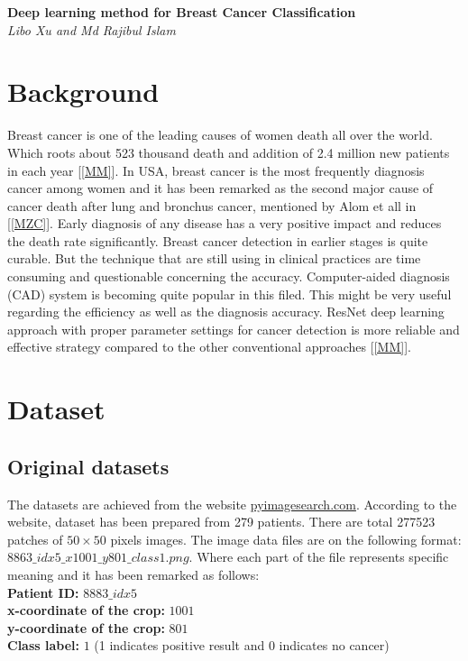 \documentclass[10 pt]{report}
\begin{document}
\begin{center}

\textbf{Deep learning method for Breast Cancer Classification}\\
 \textit{Libo Xu and Md Rajibul Islam} 
\end{center}

\section*{Background} Breast cancer is one of the leading causes of women death all over the world. Which roots about 523 thousand death and addition of 2.4 million new patients in each year [\ref{MM}]. In USA, breast cancer is the most frequently diagnosis cancer among women and it has been remarked as the second major cause of cancer death after lung and bronchus cancer, mentioned by Alom et all in [\ref{MZC}]. Early diagnosis of any disease has a very positive impact and reduces the death rate significantly. Breast cancer detection in earlier stages is quite curable. But the technique that are still using in clinical practices are time consuming and questionable concerning the accuracy. Computer-aided diagnosis (CAD) system is becoming quite popular in this filed. This might be very useful regarding the efficiency as well as the diagnosis accuracy. ResNet deep learning approach with proper parameter settings for cancer detection is more reliable and effective strategy compared to the other conventional approaches [\ref{MM}]. 


\section*{Dataset}
\subsection*{Original datasets} The datasets are achieved from the website   \url{pyimagesearch.com}. According to the website, dataset has been prepared from 279 patients. There are total 277523 patches of $50 \times 50$ pixels images. The image data files are on the following format: $8863{\_}idx5{\_x1001{\_}y801{\_}class1.png}$. Where each part of the file represents specific meaning and it has been remarked as follows:\\
\noindent
\textbf{Patient ID:} $8883{\_idx5}$\\
\textbf{x-coordinate of the crop:} $1001$\\
\textbf{y-coordinate of the crop:} $801$\\
\textbf{Class label:} $1$ (1 indicates positive result and 0 indicates no cancer)
\end{document}
